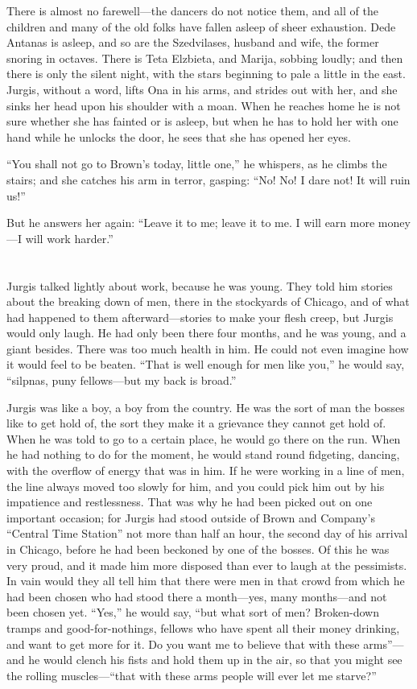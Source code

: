\documentclass[
]{article}
\begin{document}
There is almost no farewell---the dancers do not notice them, and all of the children and many of the old folks have fallen asleep of sheer exhaustion. Dede Antanas is asleep, and so are the Szedvilases, husband and wife, the former snoring in octaves. There is Teta Elzbieta, and Marija, sobbing loudly; and then there is only the silent night, with the stars beginning to pale a little in the east. Jurgis, without a word, lifts Ona in his arms, and strides out with her, and she sinks her head upon his shoulder with a moan. When he reaches home he is not sure whether she has fainted or is asleep, but when he has to hold her with one hand while he unlocks the door, he sees that she has opened her eyes.

``You shall not go to Brown's today, little one,'' he whispers, as he climbs the stairs; and she catches his arm in terror, gasping: ``No! No! I dare not! It will ruin us!''

But he answers her again: ``Leave it to me; leave it to me. I will earn more money---I will work harder.''

\section{}\label{section-1}

Jurgis talked lightly about work, because he was young. They told him stories about the breaking down of men, there in the stockyards of Chicago, and of what had happened to them afterward---stories to make your flesh creep, but Jurgis would only laugh. He had only been there four months, and he was young, and a giant besides. There was too much health in him. He could not even imagine how it would feel to be beaten. ``That is well enough for men like you,'' he would say, ``silpnas, puny fellows---but my back is broad.''

Jurgis was like a boy, a boy from the country. He was the sort of man the bosses like to get hold of, the sort they make it a grievance they cannot get hold of. When he was told to go to a certain place, he would go there on the run. When he had nothing to do for the moment, he would stand round fidgeting, dancing, with the overflow of energy that was in him. If he were working in a line of men, the line always moved too slowly for him, and you could pick him out by his impatience and restlessness. That was why he had been picked out on one important occasion; for Jurgis had stood outside of Brown and Company's ``Central Time Station'' not more than half an hour, the second day of his arrival in Chicago, before he had been beckoned by one of the bosses. Of this he was very proud, and it made him more disposed than ever to laugh at the pessimists. In vain would they all tell him that there were men in that crowd from which he had been chosen who had stood there a month---yes, many months---and not been chosen yet. ``Yes,'' he would say, ``but what sort of men? Broken-down tramps and good-for-nothings, fellows who have spent all their money drinking, and want to get more for it. Do you want me to believe that with these arms''---and he would clench his fists and hold them up in the air, so that you might see the rolling muscles---``that with these arms people will ever let me starve?''
\end{document}
